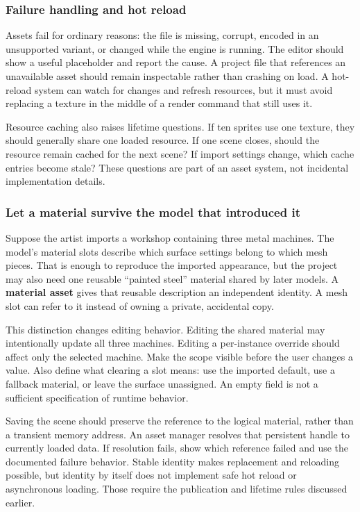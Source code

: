 \subsubsection{Failure handling and hot reload}\label{06-engine-ii-ch027-failure-handling-and-hot-reload}

Assets fail for ordinary reasons: the file is missing, corrupt, encoded in an unsupported variant, or changed while the engine is running. The editor should show a useful placeholder and report the cause. A project file that references an unavailable asset should remain inspectable rather than crashing on load. A hot-reload system can watch for changes and refresh resources, but it must avoid replacing a texture in the middle of a render command that still uses it.

Resource caching also raises lifetime questions. If ten sprites use one texture, they should generally share one loaded resource. If one scene closes, should the resource remain cached for the next scene? If import settings change, which cache entries become stale? These questions are part of an asset system, not incidental implementation details.

\subsubsection{Let a material survive the model that introduced it}\label{06-engine-ii-ch027-let-a-material-survive-the-model-that-introduced-it}

Suppose the artist imports a workshop containing three metal machines. The model's material slots describe which surface settings belong to which mesh pieces. That is enough to reproduce the imported appearance, but the project may also need one reusable ``painted steel'' material shared by later models. A \textbf{material asset} gives that reusable description an independent identity. A mesh slot can refer to it instead of owning a private, accidental copy.

This distinction changes editing behavior. Editing the shared material may intentionally update all three machines. Editing a per-instance override should affect only the selected machine. Make the scope visible before the user changes a value. Also define what clearing a slot means: use the imported default, use a fallback material, or leave the surface unassigned. An empty field is not a sufficient specification of runtime behavior.

Saving the scene should preserve the reference to the logical material, rather than a transient memory address. An asset manager resolves that persistent handle to currently loaded data. If resolution fails, show which reference failed and use the documented failure behavior. Stable identity makes replacement and reloading possible, but identity by itself does not implement safe hot reload or asynchronous loading. Those require the publication and lifetime rules discussed earlier.

